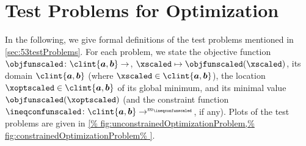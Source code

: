 \chapter{Test Problems for Optimization}
\label{chap:a20testProblems}

In the following, we give formal definitions of the test problems
mentioned in \cref{sec:53testProblems}.
For each problem, we state the objective function
$\objfunscaled\colon \clint{\*a, \*b} \to \real$,
$\xscaled \mapsto \objfunscaled(\xscaled)$,
its domain $\clint{\*a, \*b}$
(where $\xscaled \in \clint{\*a, \*b}$),
the location $\xoptscaled \in \clint{\*a, \*b}$ of its global minimum, and
its minimal value $\objfunscaled(\xoptscaled)$
(and the constraint function
$\ineqconfunscaled\colon \clint{\*a, \*b} \to \real^{m_{\ineqconfunscaled}}$,
if any).
Plots of the test problems are given in
\cref{%
  fig:unconstrainedOptimizationProblem,%
  fig:constrainedOptimizationProblem%
}.

{
  \newcommand*{\centertestfunline}[1]{%
    \mathclap{\hphantom{\mathrm{(B.99a)}}#1}%
  }
  \let\xse\xscaledentry
  
  
  
}

\cleardoublepage
